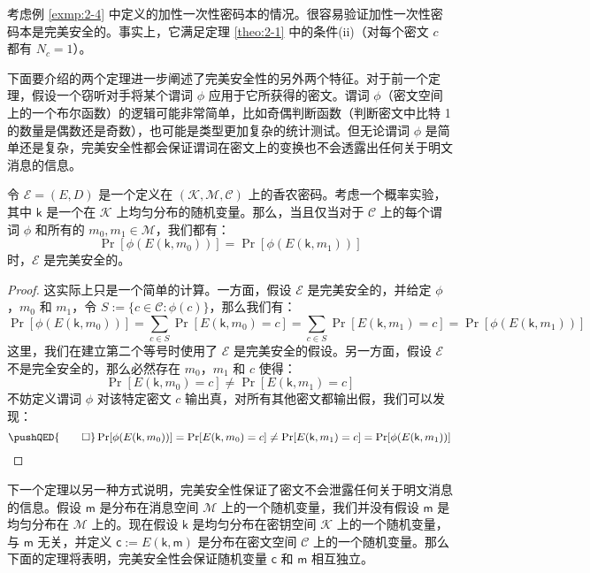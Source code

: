 \begin{example}
考虑例 \ref{exmp:2-4} 中定义的加性一次性密码本的情况。很容易验证加性一次性密码本是完美安全的。事实上，它满足定理 \ref{theo:2-1} 中的条件(ii)（对每个密文 $c$ 都有 $N_c=1$）。
\end{example}


下面要介绍的两个定理进一步阐述了完美安全性的另外两个特征。对于前一个定理，假设一个窃听对手将某个谓词 $\phi$ 应用于它所获得的密文。谓词 $\phi$（密文空间上的一个布尔函数）的逻辑可能非常简单，比如奇偶判断函数（判断密文中比特 1 的数量是偶数还是奇数），也可能是类型更加复杂的统计测试。但无论谓词 $\phi$ 是简单还是复杂，完美安全性都会保证谓词在密文上的变换也不会透露出任何关于明文消息的信息。

\begin{theorem}\label{theo:2-3}
令 $\mathcal{E}=(E,D)$ 是一个定义在 $(\mathcal{K},\mathcal{M},\mathcal{C})$ 上的香农密码。考虑一个概率实验，其中 $\mathsf{k}$ 是一个在 $\mathcal{K}$ 上均匀分布的随机变量。那么，当且仅当对于 $\mathcal{C}$ 上的每个谓词 $\phi$ 和所有的 $m_0,m_1\in\mathcal{M}$，我们都有：
\[
\Pr[\phi(E(\mathsf{k},m_0))]=
\Pr[\phi(E(\mathsf{k}, m_1))]
\]
时，$\mathcal{E}$ 是完美安全的。
\end{theorem}

\begin{proof}
这实际上只是一个简单的计算。一方面，假设 $\mathcal{E}$ 是完美安全的，并给定 $\phi$，$m_0$ 和 $m_1$，令 $S:=\{c\in\mathcal{C}:\phi(c)\}$，那么我们有：
\[
\Pr[\phi(E(\mathsf{k}, m_0))]=\sum_{c\in S}\Pr[E(\mathsf{k}, m_0) = c]=\sum_{c\in S}\Pr[E(\mathsf{k}, m_1) = c]=\Pr[\phi(E(\mathsf{k}, m_1) )]
\]
这里，我们在建立第二个等号时使用了 $\mathcal{E}$ 是完美安全的假设。另一方面，假设 $\mathcal{E}$ 不是完全安全的，那么必然存在 $m_0$，$m_1$ 和 $c$ 使得：
\[
\Pr[E(\mathsf{k},m_0)=c]\neq
\Pr[E(\mathsf{k},m_1)=c]
\]
不妨定义谓词 $\phi$ 对该特定密文 $c$ 输出真，对所有其他密文都输出假，我们可以发现：
\[
\pushQED{\qed}
\Pr[\phi(E(\mathsf{k}, m_0))]= 
\Pr[E(\mathsf{k}, m_0) = c]\neq
\Pr[E(\mathsf{k}, m_1) = c]=
\Pr[\phi(E(\mathsf{k}, m_1))]\qedhere
\]
\end{proof}

下一个定理以另一种方式说明，完美安全性保证了密文不会泄露任何关于明文消息的信息。假设 $\mathsf{m}$ 是分布在消息空间 $\mathcal{M}$ 上的一个随机变量，我们并没有假设 $\mathsf{m}$ 是均匀分布在 $\mathcal{M}$ 上的。现在假设 $\mathsf{k}$ 是均匀分布在密钥空间 $\mathcal{K}$ 上的一个随机变量，与 $\mathsf{m}$ 无关，并定义 $\mathsf{c}:=E(\mathsf{k},\mathsf{m})$ 是分布在密文空间 $\mathcal{C}$ 上的一个随机变量。那么下面的定理将表明，完美安全性会保证随机变量 $\mathsf{c}$ 和 $\mathsf{m}$ 相互独立。

